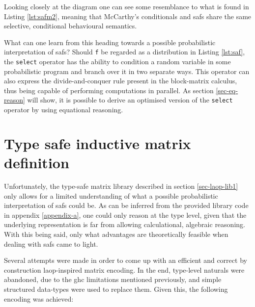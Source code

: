 \documentclass[
  oneside,
  11pt, a4paper,
  footinclude=true,
  headinclude=true,
  cleardoublepage=empty
]{scrbook}
\theoremstyle{definition}
\theoremstyle{definition}
\begin{document}
        \begin{center}
        \end{center}{}
        
        \noindent Looking closely at the diagram one can see some resemblance to what is found in Listing \ref{lst:safm2}, meaning that McCarthy's conditionals and \glspl{saf} share the same selective, conditional behavioural semantics.
        
        What can one learn from this heading towards a possible probabilistic interpretation of \glspl{saf}? Should \texttt{f} be regarded as a distribution in Listing \ref{lst:saf}, the \texttt{select} operator has the ability to condition a random variable in some probabilistic program and branch over it in two separate ways. This operator can also express the divide-and-conquer rule present in the block-matrix calculus, thus being capable of performing computations in parallel. As section \ref{sec-eq-reason} will show, it is possible to derive an optimised version of the \texttt{select} operator by using equational reasoning.
        
	\section{Type safe inductive matrix definition}
	    
     Unfortunately, the type-safe matrix library described in section \ref{sec-laop-lib1} only allows for a limited understanding of what a possible probabilistic interpretation of \glspl{saf} could be. As can be inferred from the provided library code in appendix \ref{appendix-a}, one could only reason at the type level, given that the underlying representation is far from allowing calculational, algebraic reasoning. With this being said, only what advantages are theoretically feasible when dealing with \glspl{saf} came to light.
     
     Several attempts were made in order to come up with an efficient and correct by construction \gls{laop}-inspired matrix encoding. In the end, type-level naturals were abandoned, due to the \gls{ghc} limitations mentioned previously, and simple structured data-types were used to replace them. Given this, the following encoding was achieved:
	    
\end{document}
